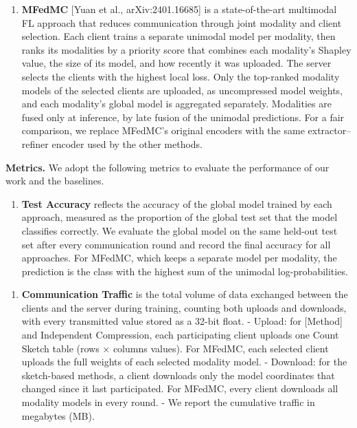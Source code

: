 \documentclass[sigconf]{acmart}
\begin{document}
\begin{enumerate}
    \item 
    {\bfseries  MFedMC}
     [Yuan et al., arXiv:2401.16685] is a state-of-the-art multimodal FL approach that reduces communication through joint modality and client selection. Each client trains a separate unimodal model per modality, then ranks its modalities by a priority score that combines each modality's Shapley value, the size of its model, and how recently it was uploaded. The server selects the clients with the highest local loss. Only the top-ranked modality models of the selected clients are uploaded, as uncompressed model weights, and each modality's global model is aggregated separately. Modalities are fused only at inference, by late fusion of the unimodal predictions. For a fair comparison, we replace MFedMC's original encoders with the same extractor–refiner encoder used by the other methods.
\end{enumerate}

{\bfseries Metrics.}
 We adopt the following metrics to evaluate the performance of our work and the baselines.

\begin{enumerate}
   \item 
  {\bfseries  Test Accuracy}
    reflects the accuracy of the global model trained by each approach, measured as the proportion of the global test set that the model classifies correctly. We evaluate the global model on the same held-out test set after every communication round and record the final accuracy for all approaches. For MFedMC, which keeps a separate model per modality, the prediction is the class with the highest sum of the unimodal log-probabilities.
\end{enumerate}

\begin{enumerate}
   \item 
  {\bfseries   Communication Traffic}
    is the total volume of data exchanged between the clients and the server during training, counting both uploads and downloads, with every transmitted value stored as a 32-bit float.
- Upload: for [Method] and Independent Compression, each participating client uploads one Count Sketch table (rows × columns values). For MFedMC, each selected client uploads the full weights of each selected modality model.
- Download: for the sketch-based methods, a client downloads only the model coordinates that changed since it last participated. For MFedMC, every client downloads all modality models in every round.
- We report the cumulative traffic in megabytes (MB).
\end{enumerate}
\end{document}
